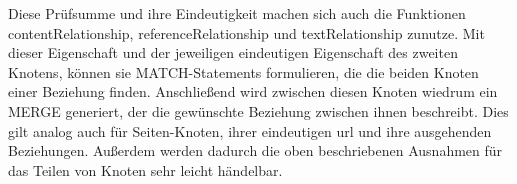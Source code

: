     Diese Prüfsumme und ihre Eindeutigkeit machen sich auch die Funktionen
    contentRelationship, referenceRelationship und textRelationship zunutze.
    Mit dieser Eigenschaft und der jeweiligen eindeutigen Eigenschaft des zweiten
    Knotens, können sie MATCH-Statements formulieren,
    die die beiden Knoten einer Beziehung finden.
    Anschließend wird zwischen diesen Knoten wiedrum ein MERGE generiert,
    der die gewünschte Beziehung zwischen ihnen beschreibt.
    Dies gilt analog auch für Seiten-Knoten, ihrer eindeutigen \gls{url}
    und ihre ausgehenden Beziehungen.
    Außerdem werden dadurch die oben beschriebenen Ausnahmen für das Teilen von Knoten sehr leicht händelbar.
